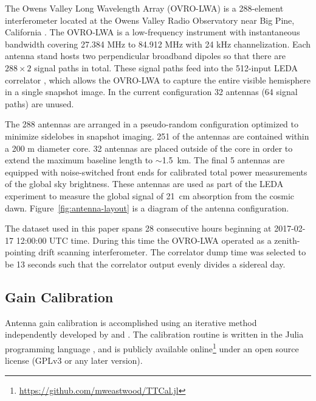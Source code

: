 \documentclass[twocolumn]{aastex61}
\begin{document}
The Owens Valley Long Wavelength Array (OVRO-LWA) is a 288-element interferometer located at the
Owens Valley Radio Observatory near Big Pine, California \citep{todo_hallinan_2017}.  The OVRO-LWA
is a low-frequency instrument with instantaneous bandwidth covering 27.384 MHz to 84.912 MHz with 24
kHz channelization.  Each antenna stand hosts two perpendicular broadband dipoles so that there are
$288\times2$ signal paths in total. These signal paths feed into the 512-input LEDA correlator
\citep{2015JAI.....450003K}, which allows the OVRO-LWA to capture the entire visible hemisphere in a
single snapshot image.  In the current configuration 32 antennas (64 signal paths) are unused.

The 288 antennas are arranged in a pseudo-random configuration optimized to minimize sidelobes in
snapshot imaging.  251 of the antennas are contained within a 200 m diameter core. 32 antennas are
placed outside of the core in order to extend the maximum baseline length to $\sim$1.5~km. The final
5 antennas are equipped with noise-switched front ends for calibrated total power measurements of
the global sky brightness.  These antennas are used as part of the LEDA experiment
\citep{todo_price_2017} to measure the global signal of 21~cm absorption from the cosmic dawn.
Figure~\ref{fig:antenna-layout} is a diagram of the antenna configuration.

The dataset used in this paper spans 28 consecutive hours beginning at 2017-02-17 12:00:00 UTC time.
During this time the OVRO-LWA operated as a zenith-pointing drift scanning interferometer.  The
correlator dump time was selected to be 13 seconds such that the correlator output evenly divides a
sidereal day.

\subsection{Gain Calibration}\label{sec:gaincal}

Antenna gain calibration is accomplished using an iterative method independently developed by
\citet{2008ISTSP...2..707M} and \citet{2014A&A...571A..97S}. The calibration routine is written in
the Julia programming language \citep{doi:10.1137/141000671}, and is publicly available
online\footnote{\url{https://github.com/mweastwood/TTCal.jl}} under an open source license (GPLv3 or
any later version).
\end{document}

